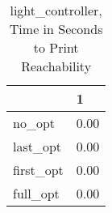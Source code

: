 \begin{table}
\caption{light\_controller, Time in Seconds to Print Reachability}
\label{light_controller_states_time}
\begin{tabular}{ll}
\toprule
 & 1 \\
\midrule
no\_opt & 0.00 \\
last\_opt & 0.00 \\
first\_opt & 0.00 \\
full\_opt & 0.00 \\
\bottomrule
\end{tabular}
\end{table}
